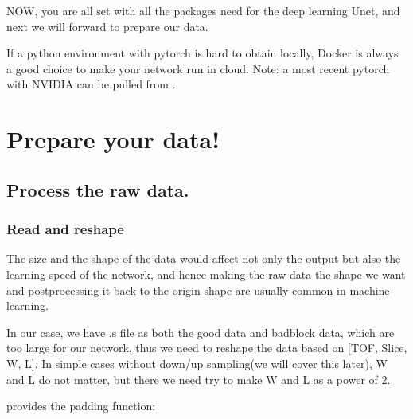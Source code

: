 \documentclass[letterpaper,10pt,english]{sphinxmanual}
\begin{document}
%
\begin{sphinxVerbatim}[commandchars=\\\{\}]
\end{sphinxVerbatim}

NOW, you are all set with all the packages need for the deep learning Unet, and next we will forward to prepare our data.




If a python environment with pytorch is hard to obtain locally, Docker is always a good choice to make your network run in cloud. Note: a most recent pytorch with NVIDIA can be pulled from .




\chapter{Prepare your data!}
\label{\detokenize{usage/data:prepare-your-data}}\label{\detokenize{usage/data::doc}}

\section{Process the raw data.}
\label{\detokenize{usage/data:process-the-raw-data}}

\subsection{Read and reshape}
\label{\detokenize{usage/data:read-and-reshape}}
The size and the shape of the data would affect not only the output but also the learning speed of the network,
and hence making the raw data the shape we want and postprocessing it back to the origin shape are usually common
in machine learning.

In our case, we have .s file as both the good data and badblock data, which are too large for our network,
thus we need to reshape the data based on {[}TOF, Slice, W, L{]}. In simple cases without down/up sampling(we will cover this later), W and L do not matter, but there we need try to make W and L as a power of 2.

 provides the padding function:

%
\begin{sphinxVerbatim}[commandchars=\\\{\}]
           
\end{sphinxVerbatim}
\end{document}
